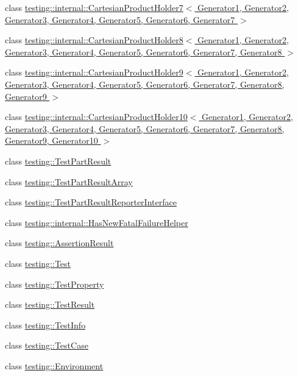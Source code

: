 \begin{DoxyCompactItemize}
\item 
class \hyperlink{classtesting_1_1internal_1_1_cartesian_product_holder7}{testing\-::internal\-::\-Cartesian\-Product\-Holder7$<$ Generator1, Generator2, Generator3, Generator4, Generator5, Generator6, Generator7 $>$}
\item 
class \hyperlink{classtesting_1_1internal_1_1_cartesian_product_holder8}{testing\-::internal\-::\-Cartesian\-Product\-Holder8$<$ Generator1, Generator2, Generator3, Generator4, Generator5, Generator6, Generator7, Generator8 $>$}
\item 
class \hyperlink{classtesting_1_1internal_1_1_cartesian_product_holder9}{testing\-::internal\-::\-Cartesian\-Product\-Holder9$<$ Generator1, Generator2, Generator3, Generator4, Generator5, Generator6, Generator7, Generator8, Generator9 $>$}
\item 
class \hyperlink{classtesting_1_1internal_1_1_cartesian_product_holder10}{testing\-::internal\-::\-Cartesian\-Product\-Holder10$<$ Generator1, Generator2, Generator3, Generator4, Generator5, Generator6, Generator7, Generator8, Generator9, Generator10 $>$}
\item 
class \hyperlink{classtesting_1_1_test_part_result}{testing\-::\-Test\-Part\-Result}
\item 
class \hyperlink{classtesting_1_1_test_part_result_array}{testing\-::\-Test\-Part\-Result\-Array}
\item 
class \hyperlink{classtesting_1_1_test_part_result_reporter_interface}{testing\-::\-Test\-Part\-Result\-Reporter\-Interface}
\item 
class \hyperlink{classtesting_1_1internal_1_1_has_new_fatal_failure_helper}{testing\-::internal\-::\-Has\-New\-Fatal\-Failure\-Helper}
\item 
class \hyperlink{classtesting_1_1_assertion_result}{testing\-::\-Assertion\-Result}
\item 
class \hyperlink{classtesting_1_1_test}{testing\-::\-Test}
\item 
class \hyperlink{classtesting_1_1_test_property}{testing\-::\-Test\-Property}
\item 
class \hyperlink{classtesting_1_1_test_result}{testing\-::\-Test\-Result}
\item 
class \hyperlink{classtesting_1_1_test_info}{testing\-::\-Test\-Info}
\item 
class \hyperlink{classtesting_1_1_test_case}{testing\-::\-Test\-Case}
\item 
class \hyperlink{classtesting_1_1_environment}{testing\-::\-Environment}
\item 

\end{DoxyCompactItemize}

